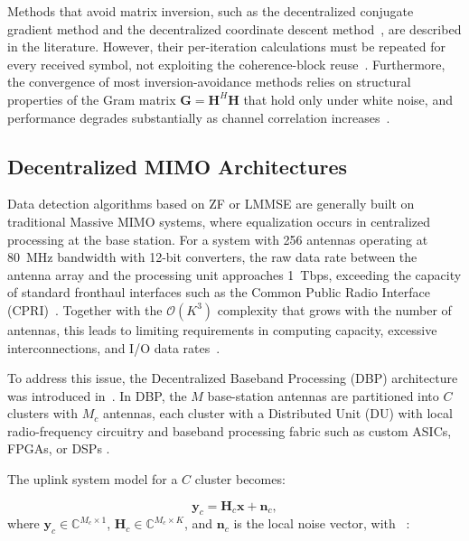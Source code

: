 \documentclass[12pt]{article}
\begin{document}
Methods that avoid matrix inversion, such as the decentralized conjugate
gradient method and the decentralized coordinate descent
method~\cite{li2019cd}, are described in the literature. However, their
per-iteration calculations must be repeated for every received symbol, not exploiting the coherence-block reuse~\cite{li-tradeofs}.
Furthermore, the convergence of most inversion-avoidance methods relies on
structural properties of the Gram matrix $\mathbf{G} = \mathbf{H}^H\mathbf{H}$
that hold only under white noise,
and performance degrades substantially as channel correlation
increases~\cite{wang2023bdnsepa}.


\subsection{Decentralized MIMO Architectures}

Data detection algorithms based on ZF or LMMSE are generally built on
traditional Massive MIMO systems, where equalization occurs in centralized
processing at the base station. For a system with 256 antennas operating at
80~MHz bandwidth with 12-bit converters, the raw data rate between the antenna
array and the processing unit approaches 1~Tbps, exceeding the capacity of
standard fronthaul interfaces such as the Common Public Radio Interface
(CPRI)~\cite{li2019cd}. Together with the $\mathcal{O}(K^3)$ complexity that
grows with the number of antennas, this leads to limiting requirements in
computing capacity, excessive interconnections, and I/O data rates~\cite{jeon2019}.


To address this issue, the Decentralized Baseband Processing (DBP) architecture was introduced in~\cite{decentralized2017, bertilsson2018distributed}. In DBP, the $M$ base-station antennas are partitioned into $C$ clusters with $M_c$ antennas, each cluster with a Distributed Unit (DU) with local radio-frequency circuitry and baseband processing fabric such as custom ASICs, FPGAs, or DSPs \cite{decentralized2017}. 

The uplink system model for a $C$ cluster becomes:

\begin{equation}
    \mathbf{y}_c = \mathbf{H}_c\mathbf{x} + \mathbf{n}_c,
\end{equation}
where $\mathbf{y}_c \in \mathbb{C}^{M_c \times 1}$,
$\mathbf{H}_c \in \mathbb{C}^{M_c \times K}$, and $\mathbf{n}_c$ is the
local noise vector, with ~\cite{jeon2019}:
\end{document}
